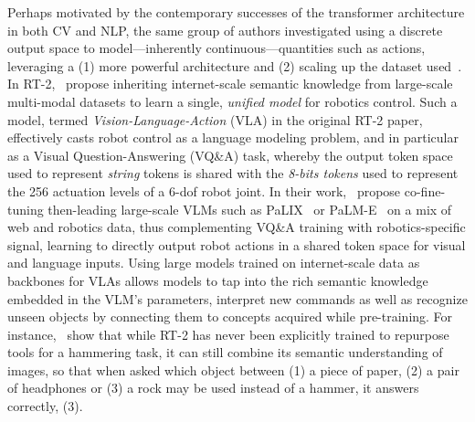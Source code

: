 Perhaps motivated by the contemporary successes of the transformer architecture in both CV and NLP, the same group of authors investigated using a discrete output space to model---inherently continuous---quantities such as actions, leveraging a (1) more powerful architecture and (2) scaling up the dataset used~\citep[RT-2]{brohanRT2VisionLanguageActionModels2023}. 
In RT-2,~\citet{brohanRT2VisionLanguageActionModels2023} propose inheriting internet-scale semantic knowledge from large-scale multi-modal datasets to learn a single, \emph{unified model} for robotics control.
Such a model, termed \emph{Vision-Language-Action} (VLA) in the original RT-2 paper, effectively casts robot control as a language modeling problem, and in particular as a Visual Question-Answering (VQ\&A) task, whereby the output token space used to represent \emph{string} tokens  is shared with the \emph{8-bits tokens} used to represent the 256 actuation levels of a 6-dof robot joint.
In their work,~\citet{brohanRT2VisionLanguageActionModels2023} propose co-fine-tuning then-leading large-scale VLMs such as PaLIX~\citep{chenPaLIXScalingMultilingual2023} or PaLM-E~\citep{driessPaLMEEmbodiedMultimodal2023} on a mix of web and robotics data, thus complementing VQ\&A training with robotics-specific signal, learning to directly output robot actions in a shared token space for visual and language inputs.
Using large models trained on internet-scale data as backbones for VLAs allows models to tap into the rich semantic knowledge embedded in the VLM's parameters, interpret new commands as well as recognize unseen objects by connecting them to concepts acquired while pre-training.
For instance,~\citet{brohanRT2VisionLanguageActionModels2023} show that while RT-2 has never been explicitly trained to repurpose tools for a hammering task, it can still combine its semantic understanding of images, so that when asked which object between (1) a piece of paper, (2) a pair of headphones or (3) a rock may be used instead of a hammer, it answers correctly, (3).

